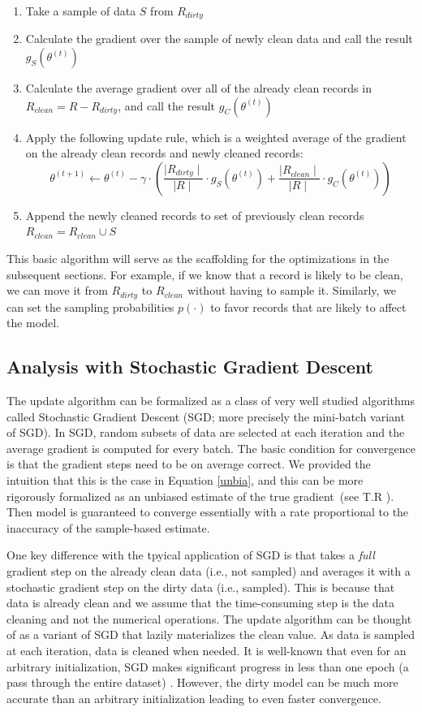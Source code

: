 \begin{enumerate}[noitemsep]
	\item Take a sample of data $S$ from $R_{dirty}$ 
	\item Calculate the gradient over the sample of newly clean data and call the result $g_S(\theta^{(t)})$
	\item Calculate the average gradient over all of the already clean records in $R_{clean}=R-R_{dirty}$, and call the result $g_C(\theta^{(t)})$
	\item Apply the following update rule, which is a weighted average of the gradient on the already clean records and newly cleaned records:
	\[
	\theta^{(t+1)} \leftarrow \theta^{(t)} - \gamma \cdot(\frac{\mid R_{dirty} \mid}{\mid R \mid} \cdot g_S(\theta^{(t)}) + \frac{\mid R_{clean} \mid}{\mid R \mid} \cdot  g_C(\theta^{(t)}))
	\]
	\item Append the newly cleaned records to set of previously clean records $R_{clean} = R_{clean} \cup S$ 
\end{enumerate} 

This basic algorithm will serve as the scaffolding for the optimizations in the subsequent sections.
For example, if we know that a record is likely to be clean, we can move it from $R_{dirty}$ to $R_{clean}$ without having to sample it.
Similarly, we can set the sampling probabilities $p(\cdot)$ to favor records that are likely to affect the model.

\subsection{Analysis with Stochastic Gradient Descent}\label{sgd}
The update algorithm can be formalized as a class of very well studied algorithms called Stochastic Gradient Descent (SGD; more precisely the mini-batch variant of SGD).
In SGD, random subsets of data are selected at each iteration and the average gradient is computed for every batch.
The basic condition for convergence is that the gradient steps need to be on average correct.
We provided the intuition that this is the case in Equation \ref{unbia}, and this can be more rigorously formalized as an unbiased estimate of the true gradient~(see T.R \cite{activecleanarxiv}).
Then model is guaranteed to converge essentially with a rate proportional to the inaccuracy of the sample-based estimate.

One key difference with the tpyical application of SGD is that \sys takes a \emph{full} gradient step on the already clean data (i.e., not sampled) and averages it with a stochastic gradient step on the dirty data (i.e., sampled). 
This is because that data is already clean and we assume that the time-consuming step is the data cleaning and not the numerical operations.
The update algorithm can be thought of as a variant of SGD that lazily materializes the clean value.
As data is sampled at each iteration, data is cleaned when needed.
It is well-known that even for an arbitrary initialization, SGD makes significant progress in less than one epoch (a pass through the entire dataset) \cite{bottou2012stochastic}.
However, the dirty model can be much more accurate than an arbitrary initialization leading to even faster convergence.

